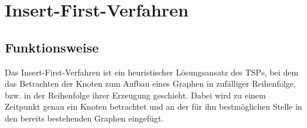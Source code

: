 \section{Insert-First-Verfahren} \label{sec:insert-first-verfahren}
\subsection{Funktionsweise}
Das Insert-First-Verfahren ist ein heuristischer Lösungsansatz des \ac{TSP}s, bei dem das Betrachten der Knoten zum Aufbau eines Graphen in zufälliger Reihenfolge, bzw. in der Reihenfolge ihrer Erzeugung geschieht.
Dabei wird zu einem Zeitpunkt genau ein Knoten betrachtet und an der für ihn bestmöglichen Stelle in den bereits bestehenden Graphen eingefügt.


